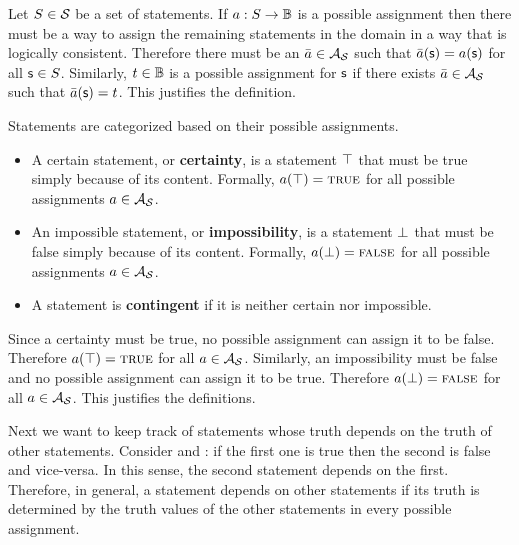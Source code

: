 \documentclass[11pt,letterpaper,fleqn]{memoir} %
\begin{document}
\begin{mathSection}
\begin{justification}
	Let $S \in \mathcal{S}$ be a set of statements. If $a : S \to \mathbb{B}$ is a possible assignment then there must be a way to assign the remaining statements in the domain in a way that is logically consistent. Therefore there must be an $\bar{a} \in \mathcal{A}_{\mathcal{S}}$ such that $\bar{a}(\mathsf{s}) = a(\mathsf{s})$ for all $\mathsf{s} \in S$. Similarly, $t \in \mathbb{B}$ is a possible assignment for $\mathsf{s}$ if there exists $\bar{a} \in \mathcal{A}_{\mathcal{S}}$ such that $\bar{a}(\mathsf{s}) = t$. This justifies the definition.
\end{justification}

\begin{defn}
	Statements are categorized based on their possible assignments.
	
	\begin{itemize}
		\item A certain statement, or \textbf{certainty}, is a statement $\top$ that must be true simply because of its content. Formally, $a(\top) = \textsc{true}$ for all possible assignments $a \in \mathcal{A}_{\mathcal{S}}$.
		\item An impossible statement, or \textbf{impossibility}, is a statement $\bot$ that must be false simply because of its content. Formally, $a(\bot) = \textsc{false}$ for all possible assignments $a \in \mathcal{A}_{\mathcal{S}}$.
		\item A statement is \textbf{contingent} if it is neither certain nor impossible.
	\end{itemize}
	
\end{defn}

\begin{justification}
	Since a certainty must be true, no possible assignment can assign it to be false. Therefore $a(\top) = \textsc{true}$ for all $a \in \mathcal{A}_{\mathcal{S}}$. Similarly, an impossibility must be false and no possible assignment can assign it to be true. Therefore $a(\bot) = \textsc{false}$ for all $a \in \mathcal{A}_{\mathcal{S}}$. This justifies the definitions.
\end{justification}

\end{mathSection}

Next we want to keep track of statements whose truth depends on the truth of other statements. Consider  and : if the first one is true then the second is false and vice-versa. In this sense, the second statement depends on the first. Therefore, in general, a statement depends on other statements if its truth is determined by the truth values of the other statements in every possible assignment.
\end{document}
